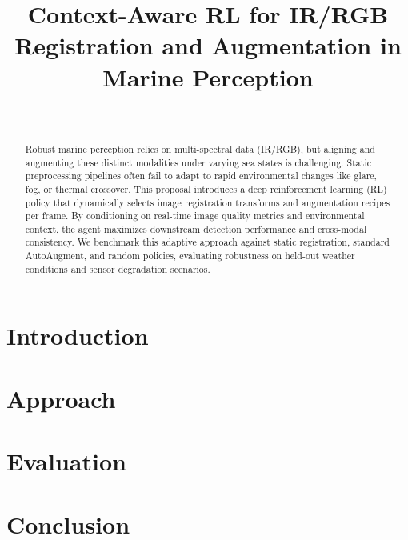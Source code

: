 \documentclass[conference]{IEEEtran}
\title{Context-Aware RL for IR/RGB Registration and Augmentation in Marine Perception}
\author{\IEEEauthorblockN{IMSEL Research Group} \\
\IEEEauthorblockA{CSCE 775: Deep Reinforcement Learning}}
\begin{document}
\maketitle

\begin{abstract}
Robust marine perception relies on multi-spectral data (IR/RGB), but aligning and augmenting these distinct modalities under varying sea states is challenging. Static preprocessing pipelines often fail to adapt to rapid environmental changes like glare, fog, or thermal crossover. This proposal introduces a deep reinforcement learning (RL) policy that dynamically selects image registration transforms and augmentation recipes per frame. By conditioning on real-time image quality metrics and environmental context, the agent maximizes downstream detection performance and cross-modal consistency. We benchmark this adaptive approach against static registration, standard AutoAugment, and random policies, evaluating robustness on held-out weather conditions and sensor degradation scenarios.
\end{abstract}


\section{Introduction}


\section{Approach}



\section{Evaluation}


\section{Conclusion}




\end{document}
